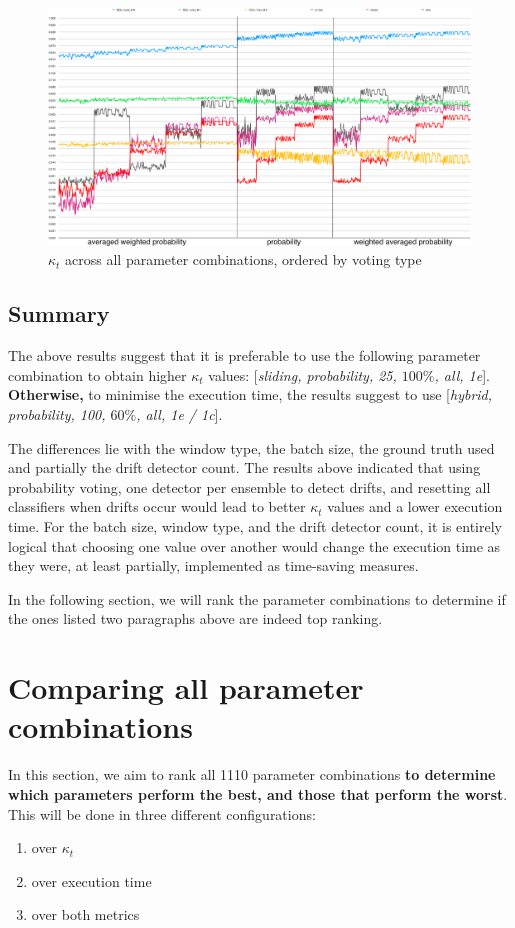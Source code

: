 \begin{figure}
  \includegraphics[width=\linewidth]{./images/chapter5/raw_voting_type}
\caption{\label{fig:order_by_voting_type}$\kappa_t$ across all parameter combinations, ordered by voting type}
\end{figure}

\subsection{Summary}
The above results suggest that it is preferable to use the following parameter combination to obtain higher $\kappa_t$ values: [\textit{sliding, probability, 25, $100\%$, all, 1e}].
\textbf{Otherwise,} to minimise the execution time, the results suggest to use [\textit{hybrid, probability, 100, $60\%$, all, 1e / 1c}].

The differences lie with the window type, the batch size, the ground truth used and partially the drift detector count. The results above indicated that using probability voting, one detector per ensemble to detect drifts, and resetting all classifiers when drifts occur would lead to better $\kappa_t$ values and a lower execution time. For the batch size, window type, and the drift detector count, it is entirely logical that choosing one value over another would change the execution time as they were, at least partially, implemented as time-saving measures.

In the following section, we will rank the parameter combinations to determine if the ones listed two paragraphs above are indeed top ranking.

\section{Comparing all parameter combinations}
In this section, we aim to rank all 1110 parameter combinations \textbf{to determine which parameters perform the best, and those that perform the worst}. This will be done in three different configurations:
\begin{enumerate}
\item over $\kappa_t$
\item over execution time
\item over both metrics
\end{enumerate}

